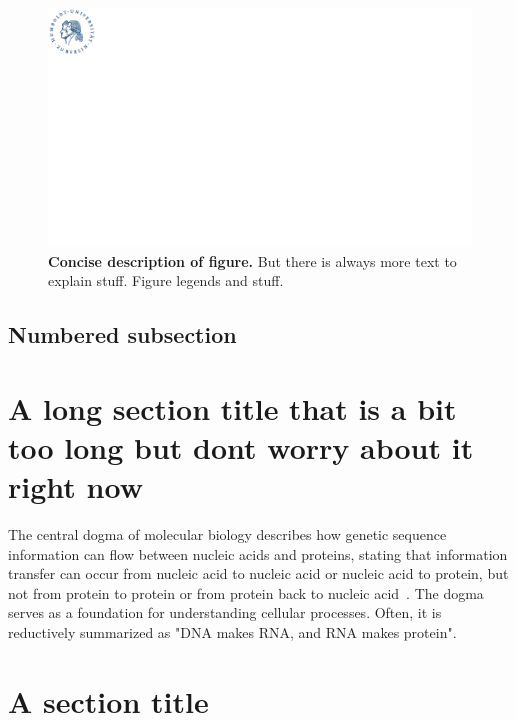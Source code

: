 \begin{figure}
    \centering
    \includegraphics[width=0.5\linewidth]{hu_siegel_blau.pdf}
    \caption[Concise description of figure.]{
    \textbf{Concise description of figure. }
    But there is always more text to explain stuff. Figure legends and stuff.
    }
    \label{fig:illustration_life_cycle}
\end{figure}


\subsection{Numbered subsection}

\kant[15]


\section[Short title]{A long section title that is a bit too long but dont worry about it right now}

The central dogma of molecular biology describes how genetic sequence information can flow between nucleic acids and proteins, stating that information transfer can occur from nucleic acid to nucleic acid or nucleic acid to protein, but not from protein to protein or from protein back to nucleic acid~\cite{crick_1958}. The dogma serves as a foundation for understanding cellular processes. Often, it is reductively summarized as "DNA makes RNA, and RNA makes protein". 




\section[blub blib]{A section title}

\kant[7]
